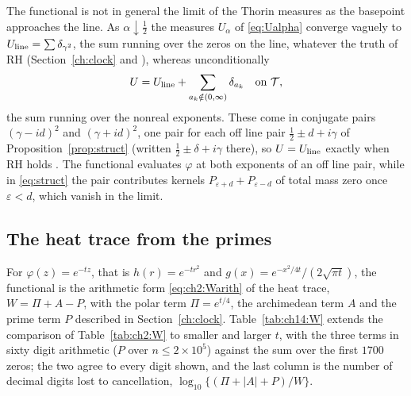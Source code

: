 The functional is not in general the limit of the Thorin measures as the basepoint approaches the line. As $\alpha\downarrow\frac12$ the measures $U_\alpha$ of \eqref{eq:Ualpha} converge vaguely to $U_{\rm line}=\sum\delta_{\gamma^2}$, the sum running over the zeros on the line, whatever the truth of RH (Section~\ref{ch:clock} and \cite[Proposition 9.5]{P17}), whereas unconditionally
\[
U=U_{\rm line}+\sum_{a_k\notin(0,\infty)}\delta_{a_k}\quad\text{on }\mathcal T,
\]
the sum running over the nonreal exponents. These come in conjugate pairs $(\gamma-id)^2$ and $(\gamma+id)^2$, one pair for each off line pair $\frac12\pm d+i\gamma$ of Proposition~\ref{prop:struct} (written $\frac12\pm\delta+i\gamma$ there), so $U=U_{\rm line}$ exactly when RH holds \cite[Proposition 9.6]{P17}. The functional evaluates $\varphi$ at both exponents of an off line pair, while in \eqref{eq:struct} the pair contributes kernels $P_{\varepsilon+d}+P_{\varepsilon-d}$ of total mass zero once $\varepsilon<d$, which vanish in the limit.

\subsection{The heat trace from the primes}\label{sec:ch14:heat}

For $\varphi(z)=e^{-tz}$, that is $h(r)=e^{-tr^2}$ and $g(x)=e^{-x^2/4t}/(2\sqrt{\pi t})$, the functional is the arithmetic form \eqref{eq:ch2:Warith} of the heat trace, $W=\Pi+A-P$, with the polar term $\Pi=e^{t/4}$, the archimedean term $A$ and the prime term $P$ described in Section~\ref{ch:clock}. Table~\ref{tab:ch14:W} extends the comparison of Table~\ref{tab:ch2:W} to smaller and larger $t$, with the three terms in sixty digit arithmetic ($P$ over $n\le2\times10^5$) against the sum over the first $1700$ zeros; the two agree to every digit shown, and the last column is the number of decimal digits lost to cancellation, $\log_{10}\{(\Pi+|A|+P)/W\}$.

